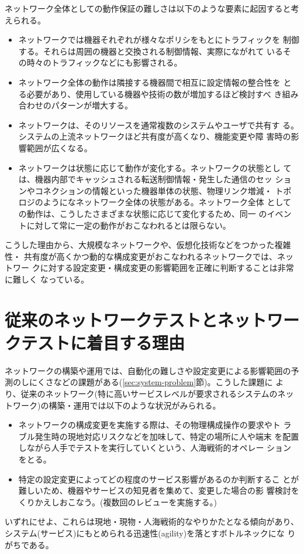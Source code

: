 ネットワーク全体としての動作保証の難しさは以下のような要素に起因すると考
えられる。
\begin{itemize}
 \item ネットワークでは機器それぞれが様々なポリシをもとにトラフィックを
       制御する。それらは周囲の機器と交換される制御情報、実際にながれて
       いるその時々のトラフィックなどにも影響される。
 \item ネットワーク全体の動作は隣接する機器間で相互に設定情報の整合性を
       とる必要があり、使用している機器や技術の数が増加するほど検討すべ
       き組み合わせのパターンが増大する。
 \item ネットワークは、そのリソースを通常複数のシステムやユーザで共有す
       る。システムの上流ネットワークほど共有度が高くなり、機能変更や障
       害時の影響範囲が広くなる。
 \item ネットワークは状態に応じて動作が変化する。ネットワークの状態とし
       ては、機器内部でキャッシュされる転送制御情報・発生した通信のセッ
       ションやコネクションの情報といった機器単体の状態、物理リンク増減・
       トポロジのようになネットワーク全体の状態がある。ネットワーク全体
       としての動作は、こうしたさまざまな状態に応じて変化するため、同一
       のイベントに対して常に一定の動作がおこなわれるとは限らない。
\end{itemize}

こうした理由から、大規模なネットワークや、仮想化技術などをつかった複雑性・
共有度が高くかつ動的な構成変更がおこなわれるネットワークでは、ネットワー
クに対する設定変更・構成変更の影響範囲を正確に判断することは非常に難しく
なっている。

  \section{従来のネットワークテストとネットワークテストに着目する理由}


ネットワークの構築や運用では、自動化の難しさや設定変更による影響範囲の予
測のしにくさなどの課題がある(\ref{sec:system-problem}節)。こうした課題に
より、従来のネットワーク(特に高いサービスレベルが要求されるシステムのネッ
トワーク)の構築・運用では以下のような状況がみられる。
\begin{itemize}
 \item ネットワークの構成変更を実施する際は、その物理構成操作の要求やト
       ラブル発生時の現地対応リスクなどを加味して、特定の場所に人や端末
       を配置しながら人手でテストを実行していくという、人海戦術的オペレー
       ションをとる。
 \item 特定の設定変更によってどの程度のサービス影響があるのか判断するこ
       とが難しいため、機器やサービスの知見者を集めて、変更した場合の影
       響検討をくりかえしおこなう。(複数回のレビューを実施する。)
\end{itemize}
いずれにせよ、これらは現地・現物・人海戦術的なやりかたとなる傾向があり、
システム(サービス)にもとめられる迅速性(agility)を落とすボトルネックにな
りがちである。

